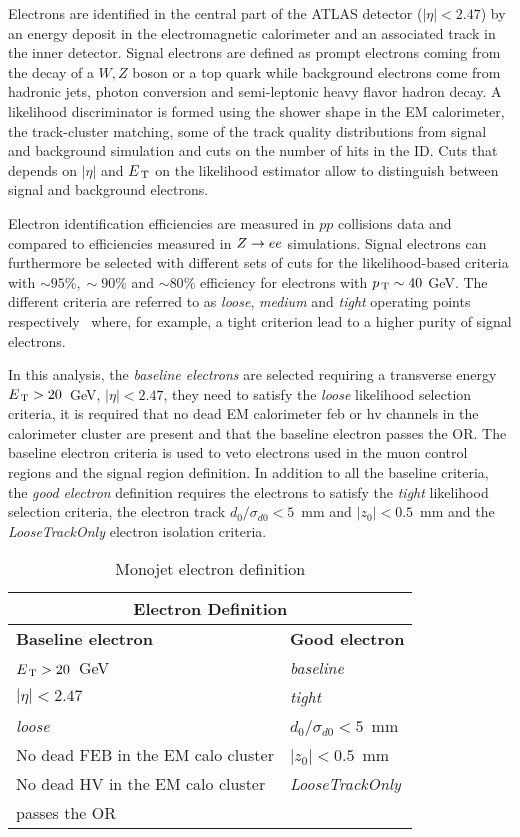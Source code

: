 Electrons are identified in the central part of the ATLAS detector
($|\eta| < 2.47$) by an energy deposit in the electromagnetic calorimeter and an
associated track in the inner detector. Signal electrons are defined as prompt
electrons coming from the decay of a $W, Z$ boson or a top quark while
background electrons come from hadronic jets, photon conversion and
semi-leptonic heavy flavor hadron decay. A likelihood discriminator is formed
using the shower shape in the EM calorimeter, the track-cluster matching, some
of the track quality distributions from signal and background simulation and
cuts on the number of hits in the ID. Cuts that depends on $|\eta|$ and $E_\mathrm{\, T}$ on
the likelihood estimator allow to distinguish between signal and background
electrons.

Electron identification efficiencies are measured in $pp$ collisions data and
compared to efficiencies measured in $Z \to e e$ simulations. Signal electrons can
furthermore be selected with different sets of cuts for the likelihood-based
criteria with $\sim 95\%, \sim 90\%$ and $\sim 80\%$ efficiency for electrons
with $p_\mathrm{\, T} \sim 40~$GeV. The different criteria are referred to as \emph{loose},
\emph{medium} and \emph{tight} operating points respectively~\cite{ATL-EL-IDENT}
where, for example, a tight criterion lead to a higher purity of signal
electrons.

In this analysis, the \emph{baseline electrons} are selected requiring a
transverse energy $E_\mathrm{\, T} > 20$~GeV, $|\eta| < 2.47$, they need to satisfy the
\emph{loose} likelihood selection criteria, it is required that no dead EM
calorimeter \gls{feb} or \gls{hv} channels in the calorimeter cluster are
present and that the baseline electron passes the OR. The baseline electron
criteria is used to veto electrons used in the muon control regions and the
signal region definition. In addition to all the baseline criteria, the
\emph{good electron} definition requires the electrons to satisfy the
\emph{tight} likelihood selection criteria, the electron track
$d_0 / \sigma_{d0} < 5$~mm and $|z_0| < 0.5$~mm and the \emph{LooseTrackOnly}
electron isolation criteria.

\begin{table}[!th]
  \centering
  \begin{tabular}{ll}
    \toprule
    \multicolumn{2}{c}{Electron Definition} \\
    \midrule \midrule
    \textbf{Baseline electron} & \textbf{Good electron} \\
    \midrule
    $E_\mathrm{\, T} > 20$~GeV & \emph{baseline} \\
    $|\eta| < 2.47$ & \emph{tight} \\
    \emph{loose} & $d_0 / \sigma_{d0} < 5$~mm \\
    No dead FEB in the EM calo cluster & $|z_0| < 0.5$~mm \\
    No dead HV in the EM calo cluster & \emph{LooseTrackOnly} \\
    passes the OR & \\
    \bottomrule
  \end{tabular}
  \caption{Monojet electron definition}
  \label{tab:ele_def}
\end{table}

